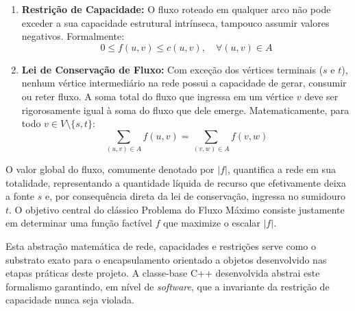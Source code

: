 \begin{enumerate}
    \item \textbf{Restrição de Capacidade:} O fluxo roteado em qualquer arco não pode exceder a sua capacidade estrutural intrínseca, tampouco assumir valores negativos. Formalmente:
    \begin{equation}
        0 \le f(u,v) \le c(u,v), \quad \forall (u,v) \in A
    \end{equation}

    \item \textbf{Lei de Conservação de Fluxo:} Com exceção dos vértices terminais ($s$ e $t$), nenhum vértice intermediário na rede possui a capacidade de gerar, consumir ou reter fluxo. A soma total do fluxo que ingressa em um vértice $v$ deve ser rigorosamente igual à soma do fluxo que dele emerge. Matematicamente, para todo $v \in V \setminus \{s, t\}$:
    \begin{equation}
        \sum_{(u,v) \in A} f(u,v) = \sum_{(v,w) \in A} f(v,w)
    \end{equation}
\end{enumerate}

O valor global do fluxo, comumente denotado por $|f|$, quantifica a rede em sua totalidade, representando a quantidade líquida de recurso que efetivamente deixa a fonte $s$ e, por consequência direta da lei de conservação, ingressa no sumidouro $t$. O objetivo central do clássico Problema do Fluxo Máximo consiste justamente em determinar uma função factível $f$ que maximize o escalar $|f|$.

Esta abstração matemática de rede, capacidades e restrições serve como o substrato exato para o encapsulamento orientado a objetos desenvolvido nas etapas práticas deste projeto. A classe-base C++ desenvolvida abstrai este formalismo garantindo, em nível de \textit{software}, que a invariante da restrição de capacidade nunca seja violada.


